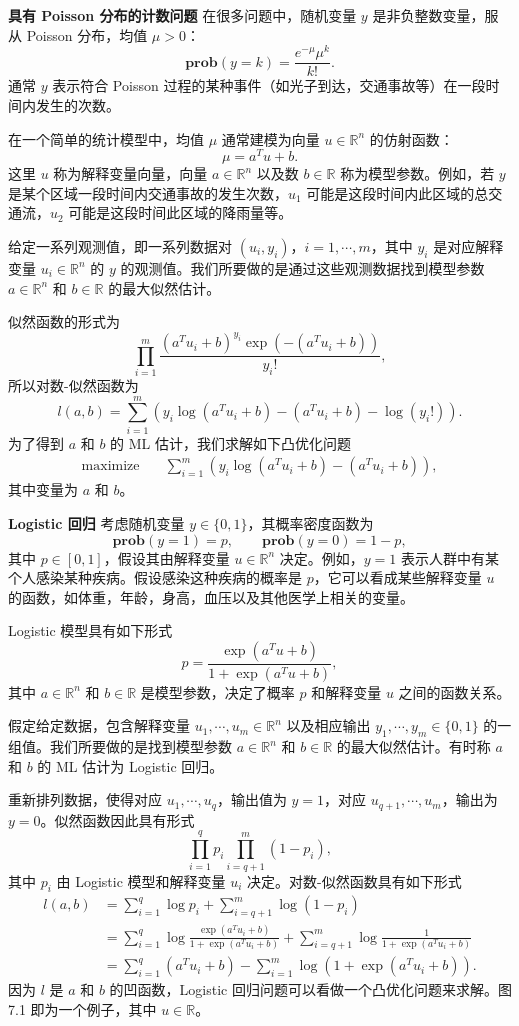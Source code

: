\documentclass[UTF8, 12pt, fontset=fandol, oneside]{ctexart}
\begin{document}
\noindent\textbf{具有 Poisson 分布的计数问题}\quad
在很多问题中，随机变量 $y$ 是非负整数变量，服从 Poisson 分布，均值 $\mu>0$：
\[
\mathbf{prob}(y=k)=\frac{e^{-\mu}\mu^k}{k!}.
\]
通常 $y$ 表示符合 Poisson 过程的某种事件（如光子到达，交通事故等）在一段时间内发生的次数。

在一个简单的统计模型中，均值 $\mu$ 通常建模为向量 $u\in\mathbb{R}^n$ 的仿射函数：
\[
\mu=a^T u+b.
\]
这里 $u$ 称为解释变量向量，向量 $a\in\mathbb{R}^n$ 以及数 $b\in\mathbb{R}$ 称为模型参数。例如，若 $y$ 是某个区域一段时间内交通事故的发生次数，$u_1$ 可能是这段时间内此区域的总交通流，$u_2$ 可能是这段时间此区域的降雨量等。

给定一系列观测值，即一系列数据对 $(u_i,y_i)$，$i=1,\cdots,m$，其中 $y_i$ 是对应解释变量 $u_i\in\mathbb{R}^n$ 的 $y$ 的观测值。我们所要做的是通过这些观测数据找到模型参数 $a\in\mathbb{R}^n$ 和 $b\in\mathbb{R}$ 的最大似然估计。

似然函数的形式为
\[
\prod_{i=1}^m \frac{(a^T u_i+b)^{y_i}\exp(-(a^T u_i+b))}{y_i!},
\]
所以对数-似然函数为
\[
l(a,b)=\sum_{i=1}^m\left(y_i\log(a^T u_i+b)-(a^T u_i+b)-\log(y_i!)\right).
\]
为了得到 $a$ 和 $b$ 的 ML 估计，我们求解如下凸优化问题
\[
\begin{aligned}
\text{maximize}\quad & \sum_{i=1}^m \left(y_i\log(a^T u_i+b)-(a^T u_i+b)\right),
\end{aligned}
\]
其中变量为 $a$ 和 $b$。

\noindent\textbf{Logistic 回归}\quad
考虑随机变量 $y\in\{0,1\}$，其概率密度函数为
\[
\mathbf{prob}(y=1)=p,\qquad \mathbf{prob}(y=0)=1-p,
\]
其中 $p\in[0,1]$，假设其由解释变量 $u\in\mathbb{R}^n$ 决定。例如，$y=1$ 表示人群中有某个人感染某种疾病。假设感染这种疾病的概率是 $p$，它可以看成某些解释变量 $u$ 的函数，如体重，年龄，身高，血压以及其他医学上相关的变量。

Logistic 模型具有如下形式
\begin{equation}
p=\frac{\exp(a^T u+b)}{1+\exp(a^T u+b)},
\tag{7.3}
\end{equation}
其中 $a\in\mathbb{R}^n$ 和 $b\in\mathbb{R}$ 是模型参数，决定了概率 $p$ 和解释变量 $u$ 之间的函数关系。

假定给定数据，包含解释变量 $u_1,\cdots,u_m\in\mathbb{R}^n$ 以及相应输出 $y_1,\cdots,y_m\in\{0,1\}$ 的一组值。我们所要做的是找到模型参数 $a\in\mathbb{R}^n$ 和 $b\in\mathbb{R}$ 的最大似然估计。有时称 $a$ 和 $b$ 的 ML 估计为 Logistic 回归。

重新排列数据，使得对应 $u_1,\cdots,u_q$，输出值为 $y=1$，对应 $u_{q+1},\cdots,u_m$，输出为 $y=0$。似然函数因此具有形式
\[
\prod_{i=1}^q p_i\prod_{i=q+1}^m (1-p_i),
\]
其中 $p_i$ 由 Logistic 模型和解释变量 $u_i$ 决定。对数-似然函数具有如下形式
\[
\begin{aligned}
l(a,b)
&=\sum_{i=1}^q \log p_i+\sum_{i=q+1}^m\log(1-p_i)\\
&=\sum_{i=1}^q \log\frac{\exp(a^T u_i+b)}{1+\exp(a^T u_i+b)}
+\sum_{i=q+1}^m \log\frac{1}{1+\exp(a^T u_i+b)}\\
&=\sum_{i=1}^q (a^T u_i+b)-\sum_{i=1}^m \log(1+\exp(a^T u_i+b)).
\end{aligned}
\]
因为 $l$ 是 $a$ 和 $b$ 的凹函数，Logistic 回归问题可以看做一个凸优化问题来求解。图 7.1 即为一个例子，其中 $u\in\mathbb{R}$。
\end{document}

